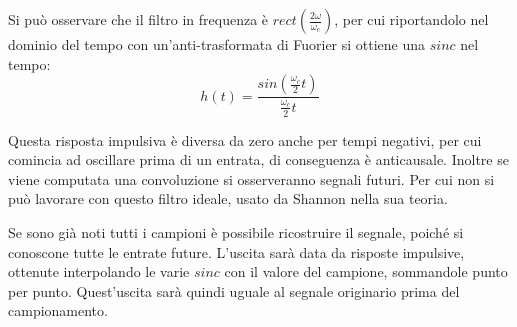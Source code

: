 \documentclass{article}
\numberwithin{equation}{subsection}
\begin{document}
Si può osservare che il filtro in frequenza è $rect\left(\displaystyle\frac{2\omega}{\omega_c}\right)$, per cui riportandolo nel dominio del tempo con un'anti-trasformata di Fuorier si ottiene una $sinc$ nel tempo: 
\begin{equation}
    h(t)=\displaystyle\frac{sin\left(\displaystyle\frac{\omega_c}{2}t\right)}{\displaystyle\frac{\omega_c}{2}t}
\end{equation}
\begin{center}
\end{center}

Questa risposta impulsiva è diversa da zero anche per tempi negativi, per cui comincia ad oscillare prima di un entrata, di conseguenza è anticausale. Inoltre 
se viene computata una convoluzione si osserveranno segnali futuri. Per cui non si può lavorare con questo filtro ideale, usato da Shannon nella sua teoria. 

Se sono già 
noti tutti i campioni è possibile ricostruire il segnale, poiché si conoscone tutte le entrate future. L'uscita sarà data da risposte impulsive, ottenute interpolando 
le varie $sinc$ con il valore del campione, sommandole punto per punto. Quest'uscita sarà quindi uguale al segnale originario prima del campionamento. 
\end{document}
